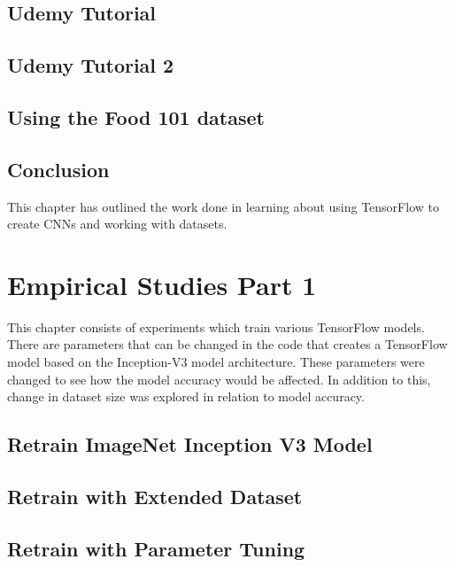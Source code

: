 \section{Udemy Tutorial}
\label{udemy1}


\section{Udemy Tutorial 2}
\label{udemy2}


\section{Using the Food 101 dataset}
\label{food101}


\section{Conclusion}
This chapter has outlined the work done in learning about using TensorFlow to create CNNs and working with datasets.

\chapter{Empirical Studies Part 1}
This chapter consists of experiments which train various TensorFlow models.
There are parameters that can be changed in the code that creates a TensorFlow model based on the Inception-V3 model architecture.
These parameters were changed to see how the model accuracy would be affected.
In addition to this, change in dataset size was explored in relation to model accuracy.


\section{Retrain ImageNet Inception V3 Model}
\label{inception}


\section{Retrain with Extended Dataset}
\label{extended}


\section{Retrain with Parameter Tuning}
\label{parameterTuning}


